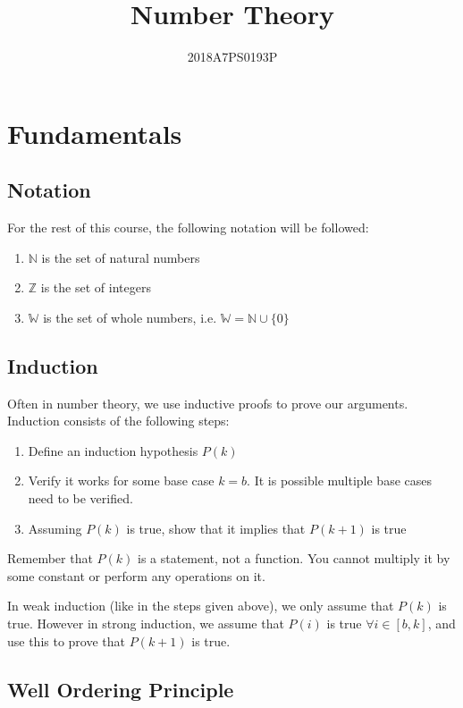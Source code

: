 \documentclass[12pt,letterpaper]{amsbook}
\title{Number Theory}
\author{2018A7PS0193P}
\theoremstyle{definition}
\newcommand{\N}{\mathbb{N}}
\newcommand{\Z}{\mathbb{Z}}
\begin{document}
\maketitle

\chapter{Fundamentals}

\section{Notation}

For the rest of this course, the following notation will be followed:

\begin{enumerate}
  \item $\N$ is the set of natural numbers
  \item $\Z$ is the set of integers
  \item $\mathbb{W}$ is the set of whole numbers, i.e. $\mathbb{W} = \N \cup \{0\}$
\end{enumerate}

\section{Induction}

Often in number theory, we use inductive proofs to prove our arguments. Induction consists of the following steps:

\begin{enumerate}
  \item Define an induction hypothesis $P(k)$
  \item Verify it works for some base case $k=b$. It is possible multiple base cases need to be verified.
  \item Assuming $P(k)$ is true, show that it implies that $P(k+1)$ is true
\end{enumerate}

Remember that $P(k)$ is a statement, not a function. You cannot multiply it by some constant or perform any operations on it.

In weak induction (like in the steps given above), we only assume that $P(k)$ is true. However in strong induction, we assume that $P(i)$ is true $\forall i \in [b,k]$, and use this to prove that $P(k+1)$ is true.

\section{Well Ordering Principle}
\end{document}
